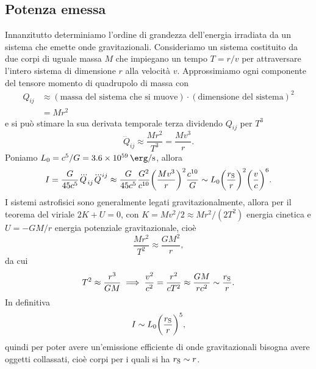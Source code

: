 \subsection{Potenza emessa}
\label{sec:potenza-emessa}

Innanzitutto determiniamo l'ordine di grandezza dell'energia irradiata da un
sistema che emette onde gravitazionali.  Consideriamo un sistema costituito da
due corpi di uguale massa $M$ che impiegano un tempo $T = r/v$ per attraversare
l'intero sistema di dimensione $r$ alla velocità $v$.  Approssimiamo ogni
componente del tensore momento di quadrupolo di massa con
\begin{equation}
  \begin{split}
    Q_{ij} &\approx (\text{massa del sistema che si muove}) \cdot
    (\text{dimensione del sistema})^{2} \\
    &= M r^{2}
  \end{split}
\end{equation}
e si può stimare la sua derivata temporale terza dividendo $Q_{ij}$ per $T^{3}$
\begin{equation}
  \dddot{Q}_{ij} \approx \frac{Mr^{2}}{T^{3}} = \frac{Mv^{3}}{r}.
\end{equation}
Poniamo $L_{0} = c^{5}/G = \SI{3.6e59}{\erg\per\second}$, allora
\begin{equation}
  I = \frac{G}{45c^{5}} \dddot{Q}_{ij} \dddot{Q}^{ij} \approx \frac{G}{45c^{5}}
  \frac{G^{2}}{c^{10}} \bigg(\frac{M v^{3}}{r}\bigg)^{2} \frac{c^{10}}{G} \sim
  L_{0} \bigg(\frac{r_{\textup{S}}}{r}\bigg)^{2} \bigg(\frac{v}{c}\bigg)^{6}.
\end{equation}
I sistemi astrofisici sono generalmente legati gravitazionalmente, allora per il
teorema del viriale $2K + U = 0$, con $K = Mv^{2}/2 \approx M r^{2}/(2T^{2})$
energia cinetica e $U = -GM/r$ energia potenziale gravitazionale, cioè
\begin{equation}
  \frac{Mr^{2}}{T^{2}} \approx \frac{GM^{2}}{r},
\end{equation}
da cui
\begin{equation}
  T^{2} \approx \frac{r^{3}}{GM} \implies \frac{v^{2}}{c^{2}} =
  \frac{r^{2}}{cT^{2}} \approx \frac{GM}{rc^{2}} \sim \frac{r_{\textup{S}}}{r}.
\end{equation}
In definitiva
\begin{equation}
  I \sim L_{0} \bigg(\frac{r_{\textup{S}}}{r}\bigg)^{5},
\end{equation}
quindi per poter avere un'emissione efficiente di onde gravitazionali bisogna
avere oggetti collassati, cioè corpi per i quali si ha $r_{\textup{S}} \sim r$.

